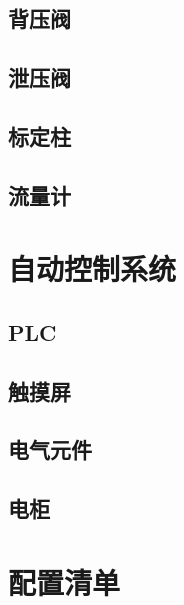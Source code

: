 \documentclass[UTF8,a4paper,12pt,titlepage]{ctexart}
\begin{document}
    \subsection{背压阀}
    
    
    \subsection{泄压阀}
    
    
    \subsection{标定柱}
    
    
    \subsection{流量计}
    

\section{自动控制系统}
   \subsection{PLC}
    
    \newpage

   \subsection{触摸屏}
    
    
   \subsection{电气元件}
    
    \newpage

   \subsection{电柜}
    
    \newpage

\section{配置清单}
    
\end{document}
